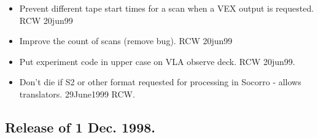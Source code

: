 \documentclass{report}
\begin{document}
\begin{itemize}
\item  Prevent different tape start times for a scan when a VEX output
       is requested.  RCW 20jun99

\item  Improve the count of scans (remove bug).  RCW 20jun99

\item  Put experiment code in upper case on VLA observe deck.  RCW 20jun99.

\item  Don't die if S2 or other format requested for processing in
       Socorro - allows translators.  29June1999 RCW.
\end{itemize}

\subsection{\label{SSSEC:1DEC98}Release of 1 Dec. 1998.}
\end{document}

